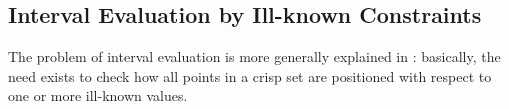 
%  

%  



\subsection{Interval Evaluation by Ill-known Constraints}
The problem of interval evaluation is more generally explained in \cite{Pon11}: basically, the need exists to check how all points in a crisp set are positioned with respect to one or more ill-known values.


